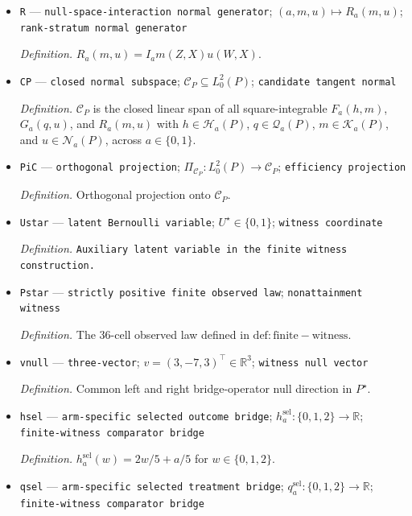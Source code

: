 \documentclass{article}
\begin{document}
\begin{itemize}
  \par\smallskip\noindent\emph{Definition.} \(G_a(q,u)=u(W,X)\{I_aq(Z,X)-1\}\).
  \item \texttt{R} --- \texttt{null-\allowbreak{}space-\allowbreak{}interaction normal generator}; \((a,m,u)\mapsto R_a(m,u)\); \texttt{rank-\allowbreak{}stratum normal generator}
  \par\smallskip\noindent\emph{Definition.} \(R_a(m,u)=I_am(Z,X)u(W,X)\).
  \item \texttt{CP} --- \texttt{closed normal subspace}; \(\mathcal C_P\subseteq L_0^2(P)\); \texttt{candidate tangent normal}
  \par\smallskip\noindent\emph{Definition.} \(\mathcal C_P\) is the closed linear span of all square-integrable \(F_a(h,m)\), \(G_a(q,u)\), and \(R_a(m,u)\) with \(h\in\mathcal H_a(P)\), \(q\in\mathcal Q_a(P)\), \(m\in\mathcal K_a(P)\), and \(u\in\mathcal N_a(P)\), across \(a\in\{0,1\}\).
  \item \texttt{PiC} --- \texttt{orthogonal projection}; \(\Pi_{\mathcal C_P}:L_0^2(P)\to\mathcal C_P\); \texttt{efficiency projection}
  \par\smallskip\noindent\emph{Definition.} Orthogonal projection onto \(\mathcal C_P\).
  \item \texttt{Ustar} --- \texttt{latent Bernoulli variable}; \(U^\star\in\{0,1\}\); \texttt{witness coordinate}
  \par\smallskip\noindent\emph{Definition.} \texttt{Auxiliary latent variable in the finite witness construction.}
  \item \texttt{Pstar} --- \texttt{strictly positive finite observed law}; \texttt{nonattainment witness}
  \par\smallskip\noindent\emph{Definition.} The \(36\)-cell observed law defined in \(\mathrm{def:finite-witness}\).
  \item \texttt{vnull} --- \texttt{three-\allowbreak{}vector}; \(v=(3,-7,3)^\top\in\mathbb R^3\); \texttt{witness null vector}
  \par\smallskip\noindent\emph{Definition.} Common left and right bridge-operator null direction in \(P^\star\).
  \item \texttt{hsel} --- \texttt{arm-\allowbreak{}specific selected outcome bridge}; \(h_a^{\mathrm{sel}}:\{0,1,2\}\to\mathbb R\); \texttt{finite-\allowbreak{}witness comparator bridge}
  \par\smallskip\noindent\emph{Definition.} \(h_a^{\mathrm{sel}}(w)=2w/5+a/5\) for \(w\in\{0,1,2\}\).
  \item \texttt{qsel} --- \texttt{arm-\allowbreak{}specific selected treatment bridge}; \(q_a^{\mathrm{sel}}:\{0,1,2\}\to\mathbb R\); \texttt{finite-\allowbreak{}witness comparator bridge}

\end{itemize}
\end{document}
